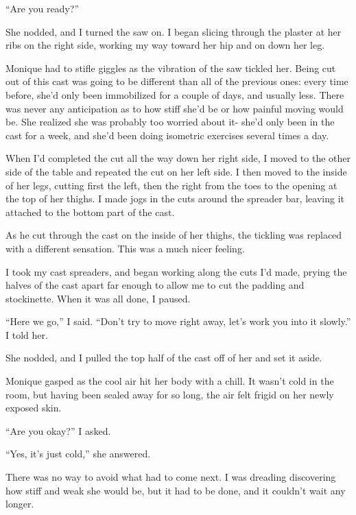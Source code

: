 ``Are you ready?''

She nodded, and I turned the saw on. I began slicing through the plaster at her ribs on the
right side, working my way toward her hip and on down her leg.

\begin{thought}
Monique had to stifle giggles as the vibration of the saw tickled her. Being cut out of
this cast was going to be different than all of the previous ones: every time before, she'd only
been immobilized for a couple of days, and usually less. There was never any anticipation as to
how stiff she'd be or how painful moving would be. She realized she was probably too worried
about it- she'd only been in the cast for a week, and she'd been doing isometric exercises
several times a day.
\end{thought}

When I'd completed the cut all the way down her right side, I moved to the other side of
the table and repeated the cut on her left side. I then moved to the inside of her legs, cutting
first the left, then the right from the toes to the opening at the top of her thighs. I made
jogs in the cuts around the spreader bar, leaving it attached to the bottom part of the cast.

\begin{thought}
As he cut through the cast on the inside of her thighs, the tickling was replaced with a
different sensation. This was a much nicer feeling.
\end{thought}

I took my cast spreaders, and began working along the cuts I'd made, prying the halves of
the cast apart far enough to allow me to cut the padding and stockinette. When it was all done,
I paused.

``Here we go,'' I said. ``Don't try to move right away, let's work you into it slowly.'' I told
her.

She nodded, and I pulled the top half of the cast off of her and set it aside.

\begin{thought}
Monique gasped as the cool air hit her body with a chill. It wasn't cold in the room, but
having been sealed away for so long, the air felt frigid on her newly exposed skin.
\end{thought}

``Are you okay?'' I asked.

``Yes, it's just cold,'' she answered.

There was no way to avoid what had to come next. I was dreading discovering how stiff and
weak she would be, but it had to be done, and it couldn't wait any longer.

